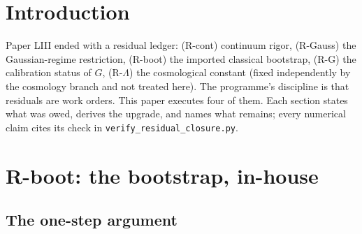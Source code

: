 \documentclass[12pt]{article}
\theoremstyle{definition}
\theoremstyle{remark}
\begin{document}
\begin{abstract}
the programme's muon $g{-}2$ analysis --- Newton's constant acquires a conditional numerical anchor: $G = \hbar c/(m_\mu\varphi^{96})^2 = 6.67305\times10^{-11}\,\mathrm{m^3kg^{-1}s^{-2}}$, within $1.9\times10^{-4}$ of measurement. The conditionality, the look-elsewhere statistics ($p\approx0.006$), and the physical reality of the residual offset are stated in full; an honesty gate shows the proton/$\alpha_G$ route is \emph{not} integer-forced and is rejected.
\end{abstract}

\section{Introduction}\label{sec:intro}

Paper LIII \citep{SmartLIII} ended with a residual ledger: (R-cont) continuum rigor, (R-Gauss) the Gaussian-regime restriction, (R-boot) the imported classical bootstrap, (R-G) the calibration status of $G$, (R-$\Lambda$) the cosmological constant (fixed independently by the cosmology branch and not treated here). The programme's discipline is that residuals are work orders. This paper executes four of them. Each section states what was owed, derives the upgrade, and names what remains; every numerical claim cites its check in \texttt{verify\_residual\_closure.py}.

\section{R-boot: the bootstrap, in-house}\label{sec:boot}

\subsection{The one-step argument}
\end{document}
